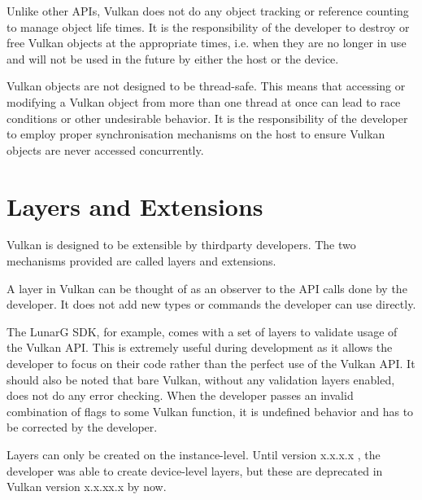     Unlike other APIs, Vulkan does not do any object tracking or reference counting to manage object life times. It is the responsibility of the developer to destroy or free Vulkan objects at the appropriate times, i.e. when they are no longer in use and will not be used in the future by either the host or the device.

    Vulkan objects are not designed to be thread-safe. This means that accessing or modifying a Vulkan object from more than one thread at once can lead to race conditions or other undesirable behavior. It is the responsibility of the developer to employ proper synchronisation mechanisms on the host to ensure Vulkan objects are never accessed concurrently.

  \section{Layers and Extensions}
  \label{sec:LayersAndExtensions}

    Vulkan is designed to be extensible by thirdparty developers. The two mechanisms provided are called layers and extensions.

    A layer in Vulkan can be thought of as an observer to the API calls done by the developer. It does not add new types or commands the developer can use directly.

    The LunarG SDK, for example, comes with a set of layers to validate usage of the Vulkan API. This is extremely useful during development as it allows the developer to focus on their code rather than the perfect use of the Vulkan API. It should also be noted that bare Vulkan, without any validation layers enabled, does not do any error checking. When the developer passes an invalid combination of flags to some Vulkan function, it is undefined behavior and has to be corrected by the developer.

    Layers can only be created on the instance-level. Until version x.x.x.x , the developer was able to create device-level layers, but these are deprecated in Vulkan version x.x.xx.x by now.



